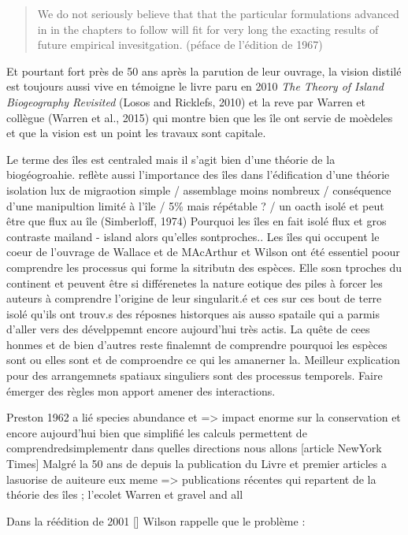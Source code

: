 \begin{quote}
We do not seriously believe that that the particular formulations
advanced in in the chapters to follow will fit for very long the
exacting results of future empirical invesitgation. (péface de l'édition
de 1967)
\end{quote}

Et pourtant fort près de 50 ans après la parution de leur ouvrage, la
vision distilé est toujours aussi vive en témoigne le livre paru en 2010
\emph{The Theory of Island Biogeography Revisited} (Losos and Ricklefs,
2010) et la reve par Warren et collègue (Warren et al., 2015) qui montre
bien que les île ont servie de moèdeles et que la vision est un point
les travaux sont capitale.

Le terme des îles est centraled mais il s'agit bien d'une théorie de la
biogéogroahie. reflète aussi l'importance des îles dans l'édification
d'une théorie isolation lux de migraotion simple / assemblage moins
nombreux / conséquence d'une manipultion limité à l'île / 5\% mais
répétable ? / un oacth isolé et peut être que flux au île (Simberloff,
1974) Pourquoi les îles en fait isolé flux et gros contraste mailand -
island alors qu'elles sontproches.. Les îles qui occupent le coeur de
l'ouvrage de Wallace et de MAcArthur et Wilson ont été essentiel poour
comprendre les processus qui forme la sitributn des espèces. Elle sosn
tproches du continent et peuvent être si différenetes la nature eotique
des piles à forcer les auteurs à comprendre l'origine de leur
singularit.é et ces sur ces bout de terre isolé qu'ils ont trouv.s des
réposnes historques ais ausso spataile qui a parmis d'aller vers des
dévelppemnt encore aujourd'hui très actis. La quête de cees honmes et de
bien d'autres reste finalemnt de comprendre pourquoi les espèces sont ou
elles sont et de comproendre ce qui les amanerner la. Meilleur
explication pour des arrangemnets spatiaux singuliers sont des processus
temporels. Faire émerger des règles mon apport amener des interactions.

Preston 1962 a lié species abundance et =\textgreater{} impact enorme
sur la conservation et encore aujourd'hui bien que simplifié les calculs
permettent de comprendredsimplementr dans quelles directions nous allons
{[}article NewYork Times{]} Malgré la 50 ans de depuis la publication du
Livre et premier articles a lasuorise de auiteure eux meme
=\textgreater{} publications récentes qui repartent de la théorie des
îles ; l'ecolet Warren et gravel and all

Dans la réédition de 2001 {[}{]} Wilson rappelle que le problème :

